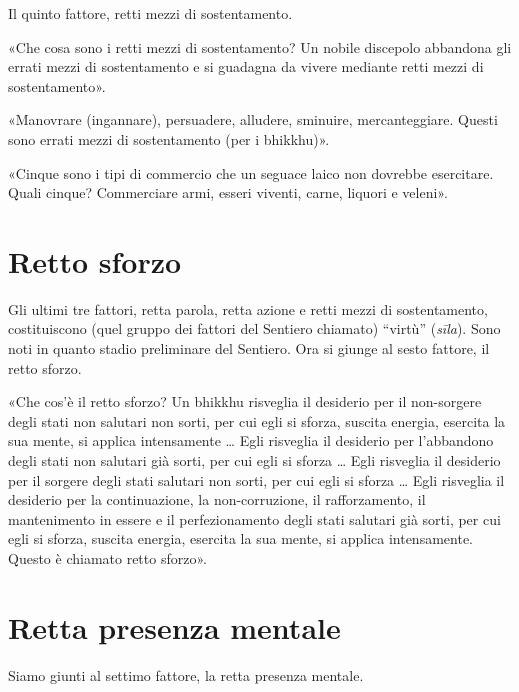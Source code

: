  Il quinto fattore, retti mezzi di sostentamento.

 «Che cosa sono i retti mezzi di sostentamento? Un nobile
discepolo abbandona gli errati mezzi di sostentamento e si guadagna da vivere
mediante retti mezzi di sostentamento».


«Manovrare (ingannare), persuadere, alludere, sminuire, mercanteggiare. Questi
sono errati mezzi di sostentamento (per i bhikkhu)».


«Cinque sono i tipi di commercio che un seguace laico non dovrebbe esercitare.
Quali cinque? Commerciare armi, esseri viventi, carne, liquori e veleni».


\section*{Retto sforzo}

 Gli ultimi tre fattori, retta parola, retta azione
e retti mezzi di sostentamento, costituiscono (quel gruppo dei fattori del
Sentiero chiamato) “virtù” (\emph{sīla}). Sono noti in quanto stadio preliminare
del Sentiero. Ora si giunge al sesto fattore, il retto sforzo.

 «Che cos’è il retto sforzo? Un bhikkhu risveglia il
desiderio per il non-sorgere degli stati non salutari non sorti, per cui egli si
sforza, suscita energia, esercita la sua mente, si applica intensamente … Egli
risveglia il desiderio per l’abbandono degli stati non salutari già sorti, per
cui egli si sforza … Egli risveglia il desiderio per il sorgere degli stati
salutari non sorti, per cui egli si sforza … Egli risveglia il desiderio per la
continuazione, la non-corruzione, il rafforzamento, il mantenimento in essere e
il perfezionamento degli stati salutari già sorti, per cui egli si sforza,
suscita energia, esercita la sua mente, si applica intensamente. Questo è
chiamato retto sforzo».


\section*{Retta presenza mentale}

\label{pag267}%
 Siamo giunti al settimo fattore, la retta presenza
mentale.


